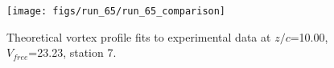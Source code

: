 \begin{figure}[H]
\centering
\texttt{[image: figs/run\_65/run\_65\_comparison]}
\caption{Theoretical vortex profile fits to experimental data at $z/c$=10.00, $V_{free}$=23.23, station 7.}
\label{fig:run_65_comparison}
\end{figure}


